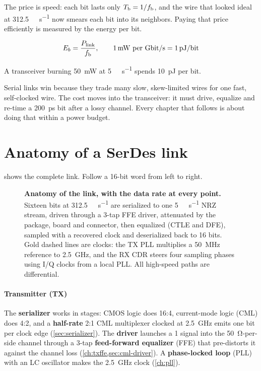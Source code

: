 The price is speed: each bit lasts only $T_\mathrm{b} = 1/f_\mathrm{b}$, and the wire that looked ideal at \qty{312.5}{\mega\bit\per\second} now smears each bit into its neighbors. Paying that price efficiently is measured by the energy per bit.

\begin{keyeq}
\begin{equation}
  E_b = \frac{P_\mathrm{link}}{\fb}, \qquad \qty{1}{\milli\watt} \text{ per } \unit{\giga\bit\per\second} = \qty{1}{\pico\joule\per\bit}
  \label{eq:ch1-energy}
\end{equation}
\end{keyeq}
A transceiver burning \qty{50}{\milli\watt} at \qty{5}{\giga\bit\per\second} spends \qty{10}{\pico\joule} per bit.

\begin{insight}
Serial links win because they trade many slow, skew-limited wires for one fast, self-clocked wire. The cost moves into the transceiver: it must drive, equalize and re-time a \qty{200}{\pico\second} bit after a lossy channel. Every chapter that follows is about doing that within a power budget.
\end{insight}

\section{Anatomy of a SerDes link}\label{sec:anatomy}
 shows the complete \OS{} link. Follow a 16-bit word from left to right.

\begin{figure}[htbp]
\centering

\caption{\textbf{Anatomy of the \OS{} link, with the data rate at every point.} Sixteen bits at \qty{312.5}{\mega\bit\per\second} are serialized to one \qty{5}{\giga\bit\per\second} NRZ stream, driven through a 3-tap FFE driver, attenuated by the package, board and connector, then equalized (CTLE and DFE), sampled with a recovered clock and deserialized back to 16 bits. Gold dashed lines are clocks: the TX PLL multiplies a \qty{50}{\mega\hertz} reference to \qty{2.5}{\giga\hertz}, and the RX CDR steers four sampling phases using I/Q clocks from a local PLL. All high-speed paths are differential.}
\label{fig:link-anatomy}
\end{figure}

\paragraph{Transmitter (TX)} The \textbf{serializer} works in stages: CMOS logic does 16:4, current-mode logic (CML) does 4:2, and a \textbf{half-rate} 2:1 CML multiplexer clocked at \qty{2.5}{\giga\hertz} emits one bit per clock edge (\cref{sec:serializer}). The \textbf{driver} launches a \qty{1}{\Vppd} signal into the \qty{50}{\ohm}-per-side channel through a 3-tap \textbf{feed-forward equalizer} (FFE) that pre-distorts it against the channel loss (\cref{ch:txffe,sec:cml-driver}). A \textbf{phase-locked loop} (PLL) with an LC oscillator makes the \qty{2.5}{\giga\hertz} clock (\cref{ch:pll}).

